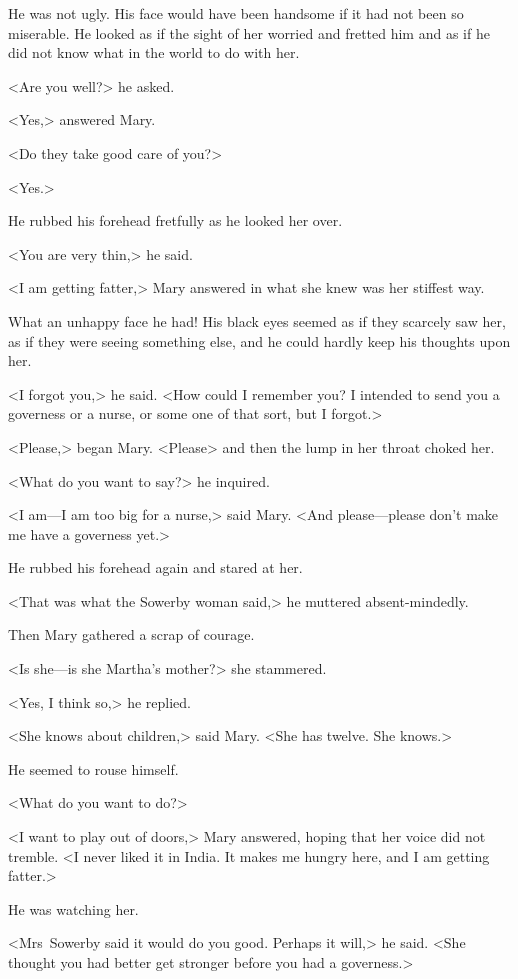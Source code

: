 He was not ugly. His face would have been handsome if it had not been so miserable. He looked as if the sight of her worried and fretted him and as if he did not know what in the world to do with her.

<Are you well?> he asked.

<Yes,> answered Mary.

<Do they take good care of you?>

<Yes.>

He rubbed his forehead fretfully as he looked her over.

<You are very thin,> he said.

<I am getting fatter,> Mary answered in what she knew was her stiffest way.

What an unhappy face he had! His black eyes seemed as if they scarcely saw her, as if they were seeing something else, and he could hardly keep his thoughts upon her.

<I forgot you,> he said. <How could I remember you? I intended to send you a governess or a nurse, or some one of that sort, but I forgot.>

<Please,> began Mary. <Please\longdash> and then the lump in her throat choked her.

<What do you want to say?> he inquired.

<I am—I am too big for a nurse,> said Mary. <And please—please don't make me have a governess yet.>

He rubbed his forehead again and stared at her.

<That was what the Sowerby woman said,> he muttered absent-mindedly.

Then Mary gathered a scrap of courage.

<Is she—is she Martha's mother?> she stammered.

<Yes, I think so,> he replied.

<She knows about children,> said Mary. <She has twelve. She knows.>

He seemed to rouse himself.

<What do you want to do?>

<I want to play out of doors,> Mary answered, hoping that her voice did not tremble. <I never liked it in India. It makes me hungry here, and I am getting fatter.>

He was watching her.

<Mrs~Sowerby said it would do you good. Perhaps it will,> he said. <She thought you had better get stronger before you had a governess.>

